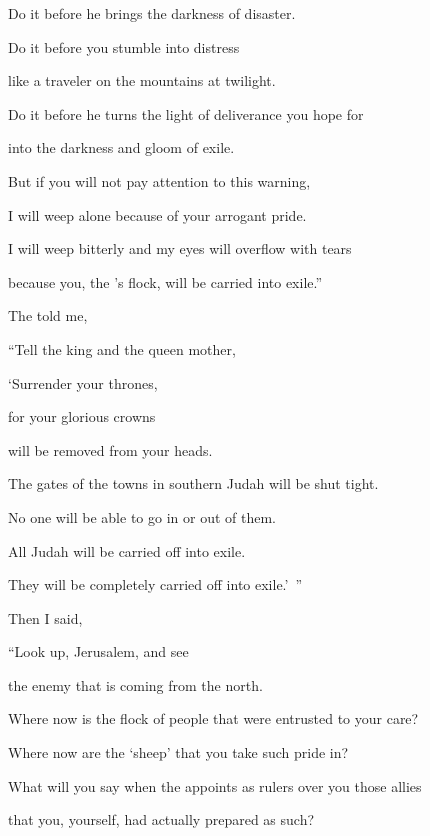 {\par }{\Q Do it before
he brings the darkness
of disaster.

\par }{\Q Do it before
you stumble
into distress
\par }{\Q like a traveler on
the mountains
at twilight.
\par }{\Q Do it before he turns
the light
of deliverance you hope
for
\par }{\Q into the darkness
and gloom of exile.
\par }{\Q {}But if
you will not
pay attention
to this warning,

\par }{\Q I will weep
alone
because
of your arrogant pride.
\par }{\Q I will weep bitterly
and my eyes
will overflow
with tears
\par }{\Q because
you, the
{}’s
flock,
will be carried into exile.”
\par }{\PP {}The
{} told
me,

\par }{\Q “Tell the king
and the queen mother,
\par }{\Q ‘Surrender
your thrones,
\par }{\Q for
your glorious
crowns
\par }{\Q will be removed
from your heads.
\par }{\Q {}The gates of the towns
in southern
Judah will be shut
tight.

\par }{\Q No
one will be able
to go
in or out of them.

\par }{\Q All
Judah
will be carried off into exile.
\par }{\Q They will be completely carried off into exile.’ ”
\par }{\PP {}Then I said,

\par }{\Q “Look
up,
Jerusalem, and see
\par }{\Q the enemy that is coming
from the north.
\par }{\Q Where
now is the flock
of people that were entrusted
to your care?

\par }{\Q Where now are the ‘sheep’
that you take such pride in?
\par }{\Q {}What
will you say
when the
{} appoints
as rulers over
you
those allies
\par }{\Q that you, yourself, had actually prepared
as such?

}
